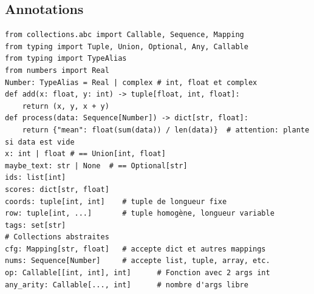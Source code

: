 \documentclass{article}
\begin{document}
\begin{multicols*}{4}
\section*{Annotations}
\begin{lstlisting}
from collections.abc import Callable, Sequence, Mapping
from typing import Tuple, Union, Optional, Any, Callable
from typing import TypeAlias
from numbers import Real
Number: TypeAlias = Real | complex # int, float et complex
def add(x: float, y: int) -> tuple[float, int, float]:
    return (x, y, x + y)
def process(data: Sequence[Number]) -> dict[str, float]:
    return {"mean": float(sum(data)) / len(data)}  # attention: plante si data est vide
x: int | float # == Union[int, float]
maybe_text: str | None  # == Optional[str]
ids: list[int]
scores: dict[str, float]
coords: tuple[int, int]    # tuple de longueur fixe
row: tuple[int, ...]       # tuple homogène, longueur variable
tags: set[str]
# Collections abstraites
cfg: Mapping[str, float]   # accepte dict et autres mappings
nums: Sequence[Number]     # accepte list, tuple, array, etc.
op: Callable[[int, int], int]      # Fonction avec 2 args int
any_arity: Callable[..., int]      # nombre d'args libre\end{lstlisting}


\end{multicols*}
\end{document}
